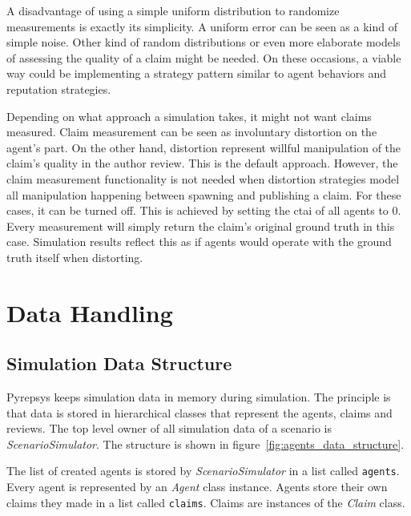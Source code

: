 \documentclass[%
    ]{\PathToTumTemplate/thesis/tum_thesis}
\begin{document}
A disadvantage of using a simple uniform distribution to randomize measurements is exactly its simplicity.
A uniform error can be seen as a kind of simple noise.
Other kind of random distributions or even more elaborate models of assessing the quality of a claim might be needed.
On these occasions, a viable way could be implementing a strategy pattern similar to agent behaviors and reputation strategies.

Depending on what approach a simulation takes, it might not want claims measured.
Claim measurement can be seen as involuntary distortion on the agent's part.
On the other hand, distortion represent willful manipulation of the claim's quality in the author review.
This is the default approach.
However, the claim measurement functionality is not needed when distortion strategies model all manipulation happening between spawning and publishing a claim.
For these cases, it can be turned off.
This is achieved by setting the \gls{ctai} of all agents to 0.
Every measurement will simply return the claim's original ground truth in this case.
Simulation results reflect this as if agents would operate with the ground truth itself when distorting.



\section{Data Handling}\label{sec:impl_data}


\subsection{Simulation Data Structure}
Pyrepsys keeps simulation data in memory during simulation.
The principle is that data is stored in hierarchical classes that represent the agents, claims and reviews.
The top level owner of all simulation data of a scenario is \emph{ScenarioSimulator}.
The structure is shown in figure~\ref{fig:agents_data_structure}.

The list of created agents is stored by \emph{ScenarioSimulator} in a list called \texttt{agents}.
Every agent is represented by an \emph{Agent} class instance.
Agents store their own claims they made in a list called \texttt{claims}.
Claims are instances of the \emph{Claim} class.
\end{document}
